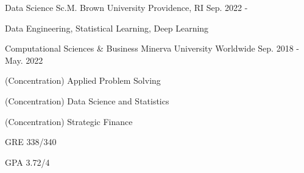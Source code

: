 \begin{cventries}
  \cventry
    {Data Science Sc.M.}
    {Brown University}
    {Providence, RI}
    {Sep. 2022 -}
    {
    \begin{cvitems}
        \item {Data Engineering, Statistical Learning, Deep Learning}
    \end{cvitems}
    }

  \cventry
    {Computational Sciences \& Business}
    {Minerva University}
    {Worldwide}
    {Sep. 2018 - May. 2022}
    {
      \begin{cvitems}
        \item {(Concentration) Applied Problem Solving}
        \item {(Concentration) Data Science and Statistics}
        \item {(Concentration) Strategic Finance}
        \item {GRE 338/340}
        \item {GPA 3.72/4}
      \end{cvitems}
    }
\end{cventries}
